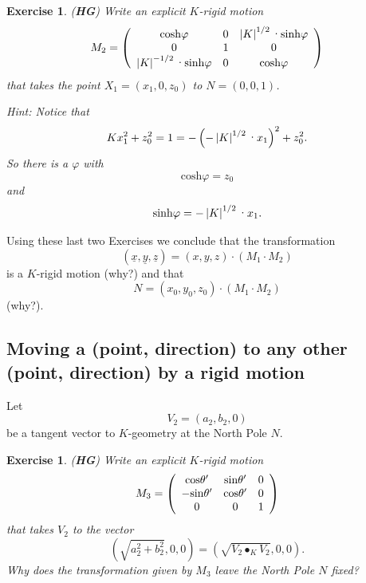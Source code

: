\documentclass{article}%
\newtheorem{exercise}[theorem]{Exercise}
\begin{document}
\begin{exercise}
(\textbf{HG}) Write an explicit $K$-rigid motion%
\[
M_{2}=\left(
\begin{array}
[c]{ccc}%
\mathrm{cosh}\varphi & 0 & \left\vert K\right\vert ^{1/2}%
\text{\textperiodcentered}\mathrm{sinh}\varphi\\
0 & 1 & 0\\
\left\vert K\right\vert ^{-1/2}\text{\textperiodcentered}\mathrm{sinh}\varphi
& 0 & \mathrm{cosh}\varphi
\end{array}
\right)
\]
that takes the point $X_{1}=\left(  x_{1},0,z_{0}\right)  $ to $N=\left(
0,0,1\right)  $.

Hint: Notice that%
\[
Kx_{1}^{2}+z_{0}^{2}=1=-\left(  -\left\vert K\right\vert ^{1/2}%
\text{\textperiodcentered}x_{1}\right)  ^{2}+z_{0}^{2}.
\]
So there is a $\varphi$ with
\[
\mathrm{cosh}\varphi=z_{0}%
\]
and%
\[
\mathrm{sinh}\varphi=-\left\vert K\right\vert ^{1/2}\text{\textperiodcentered
}x_{1}.
\]

\end{exercise}

Using these last two Exercises we conclude that the transformation%
\[
\left(  \underline{x},\underline{y},\underline{z}\right)  =\left(
x,y,z\right)  \cdot\left(  M_{1}\cdot M_{2}\right)
\]
is a $K$-rigid motion (why?) and that%
\[
N=\left(  x_{0},y_{0},z_{0}\right)  \cdot\left(  M_{1}\cdot M_{2}\right)
\]
(why?).

\pagebreak

\subsection{Moving a (point, direction) to any other (point, direction) by a
rigid motion}

Let
\[
V_{2}=\left(  a_{2},b_{2},0\right)
\]
be a tangent vector to $K$-geometry at the North Pole $N$.

\begin{exercise}
(\textbf{HG}) Write an explicit $K$-rigid motion%
\[
M_{3}=\left(
\begin{array}
[c]{ccc}%
\mathrm{cos}\theta^{\prime} & \mathrm{sin}\theta^{\prime} & 0\\
-\mathrm{sin}\theta^{\prime} & \mathrm{cos}\theta^{\prime} & 0\\
0 & 0 & 1
\end{array}
\right)
\]
that takes $V_{2}$ to the vector%
\[
\left(  \sqrt{a_{2}^{2}+b_{2}^{2}},0,0\right)  =\left(  \sqrt{V_{2}\bullet
_{K}V_{2}},0,0\right)  .
\]
Why does the transformation given by $M_{3}$ leave the North Pole $N$ fixed?
\end{exercise}
\end{document}
